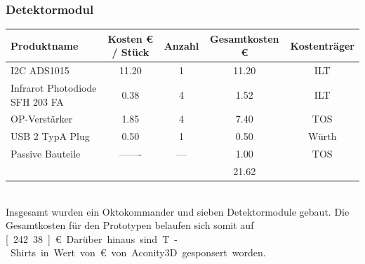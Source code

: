 \subsubsection*{Detektormodul} 
\begin{tabularx}{\textwidth}{L{3.5cm} | S c S c}
	Produktname 					& {Kosten \unit{€} / Stück}	& Anzahl & {Gesamtkosten \unit{€}}	& Kostenträger \\ 
	\hline
	I2C ADS1015						& 11.20  	&   1    & 11.20	& ILT    \\ [2mm]
	Infrarot Photodiode SFH 203 FA	& 0.38		&   4    & 1.52 	& ILT	 \\ [15mm]
	OP-Verstärker    				& 1.85   	&	4    & 7.40 	& TOS    \\ [2mm]
	USB 2 TypA Plug					& 0.50  	&   1    & 0.50 	& Würth  \\ [2mm]
	Passive Bauteile    			& {-------} & {---}	 & 1.00	   	& TOS    \\ [2mm]
	\hline
									&			&		 & 21.62	&		
\end{tabularx} \\

\noindent
Insgesamt wurden ein Oktokommander und sieben Detektormodule gebaut. Die Gesamtkosten für den Prototypen belaufen sich somit auf \unit[242.38]{€}. Darüber hinaus sind T-Shirts in Wert von \unit[200]{€} von Aconity3D gesponsert worden.